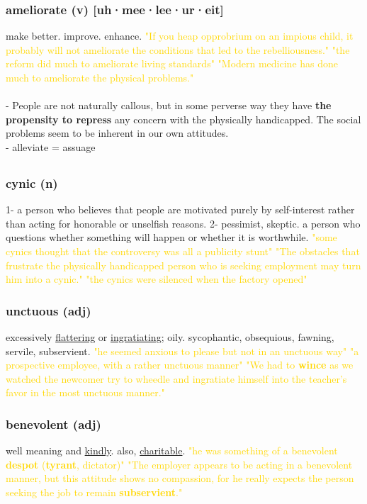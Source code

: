 \documentclass{proc}
\begin{document}
	\subsubsection{\textcolor{brickred}{ameliorate} (v) [uh·mee·lee·ur·eit]}
	make better. improve. enhance.
	\textcolor{gold}{"If you heap opprobrium on an impious child, it probably will not ameliorate the conditions that led to the rebelliousness." "the reform did much to ameliorate living standards" "Modern medicine has done much to ameliorate the physical problems."}\\\\
	- People are not naturally callous, but in some perverse way they have \textbf{the propensity to repress} any concern with the  physically handicapped. The social problems seem to be inherent in our own attitudes.\\
	- alleviate = assuage
	
	\newpage
	\subsection{}
	\subsubsection{\textcolor{brickred}{cynic} (n)}
	1- a person who believes that people are motivated purely by self-interest rather than acting for honorable or unselfish reasons.
	2- pessimist, skeptic. a person who questions whether something will happen or whether it is worthwhile.
	\textcolor{gold}{"some cynics thought that the controversy was all a publicity stunt" "The obstacles that frustrate the physically handicapped person who is seeking employment may turn him into a cynic." "the cynics were silenced when the factory opened"}
	
	\subsubsection{\textcolor{brickred}{unctuous} (adj)}
	excessively \underline{flattering} or \underline{ingratiating}; oily. sycophantic, obsequious,
	fawning,
	servile,
	subservient.
	\textcolor{gold}{"he seemed anxious to please but not in an unctuous way" "a prospective employee, with a rather unctuous manner" "We had to \textbf{wince} as we watched the newcomer try to wheedle and ingratiate himself into the teacher's favor in the most unctuous manner."}
	
	\subsubsection{\textcolor{brickred}{benevolent} (adj)}
	well meaning and \underline{kindly}. also, \underline{charitable}.
	\textcolor{gold}{"he was something of a benevolent \textbf{despot} (\textbf{tyrant}, dictator)" "The employer appears to be acting in a benevolent manner, but this attitude shows no compassion, for he really expects the person seeking the job to remain \textbf{subservient}."}
	
\end{document}

